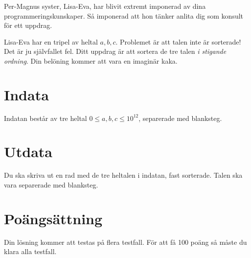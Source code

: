 
Per-Magnus syster, Lisa-Eva, har blivit extremt imponerad av dina programmeringskunskaper. Så imponerad att hon tänker anlita dig som konsult för ett uppdrag.

Lisa-Eva har en tripel av heltal $a, b, c$. Problemet är att talen inte är sorterade! 
Det är ju självfallet fel. Ditt uppdrag är att sortera de tre talen \emph{i stigande ordning}. Din belöning kommer att vara en imaginär kaka.

\section*{Indata}

Indatan består av tre heltal $0 \le a, b, c \le 10^{12}$, separerade med blanksteg.

\section*{Utdata}
Du ska skriva ut en rad med de tre heltalen i indatan, fast sorterade. Talen ska vara separerade med blanksteg.

\section*{Poängsättning}
Din lösning kommer att testas på flera testfall. För att få 100 poäng så måste du klara alla testfall.
